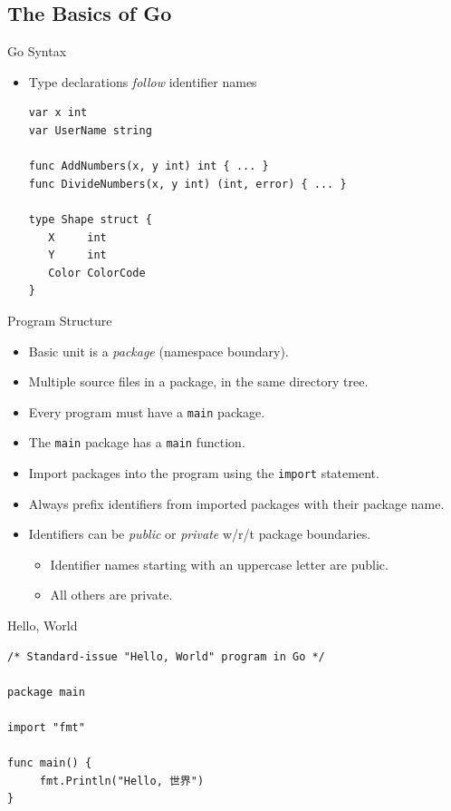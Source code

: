 \documentclass[pdf]{beamer}
\newcommand\z[1]{\texttt{#1}}
\begin{document}
\subsection{The Basics of Go}
\begin{frame}[fragile]{Go Syntax}
	\begin{itemize}
		\item Type declarations \emph{follow} identifier names
\begin{lstlisting}
var x int
var UserName string

func AddNumbers(x, y int) int { ... }
func DivideNumbers(x, y int) (int, error) { ... }

type Shape struct {
   X     int
   Y     int
   Color ColorCode
}
\end{lstlisting}
	\end{itemize}
\end{frame}
\begin{frame}{Program Structure}
	\begin{itemize}
		\item Basic unit is a \emph{package} (namespace boundary).\pause
		\item Multiple source files in a package, in the same directory tree.\pause
		\item Every program must have a \z{main} package.
		\item The \z{main} package has a \z{main} function.\pause
		\item Import packages into the program using the \z{import} statement.
		\item Always prefix identifiers from imported packages with their package name.\pause
		\item Identifiers can be \emph{public} or \emph{private} w/r/t package boundaries.
			\begin{itemize}
				\item Identifier names starting with an uppercase letter are public.
				\item All others are private.
			\end{itemize}
	\end{itemize}
\end{frame}
\begin{frame}[fragile]{Hello, World}
\begin{lstlisting}
/* Standard-issue "Hello, World" program in Go */

package main

import "fmt"

func main() {
     fmt.Println("Hello, 世界")
}
\end{lstlisting}
\end{frame}
\end{document}
